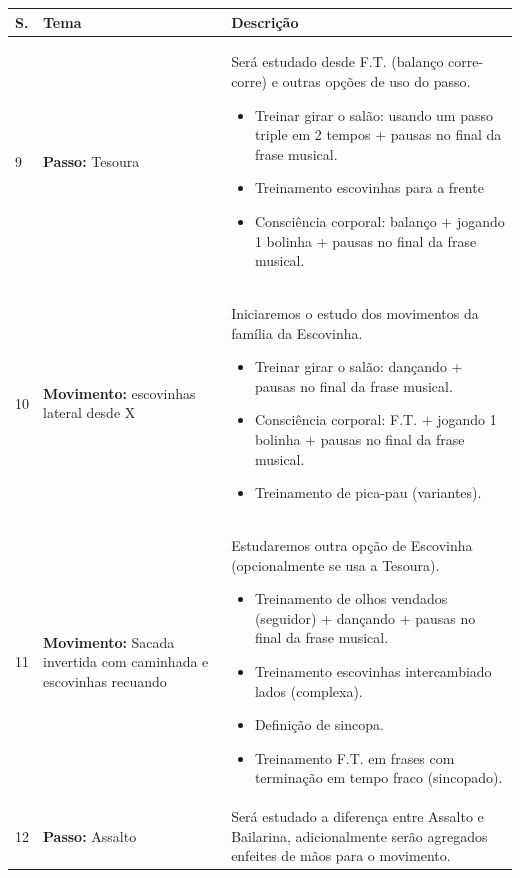 \documentclass[12pt, a4paper]{article}
\begin{document}
\begin{table}[h]
\centering
\begin{tabular}{|p{0.5cm}|p{3.0cm}|p{12.0cm}|}
\hline
S. & Tema & Descrição \\  \hline \hline
9 &  \textbf{Passo:} Tesoura & Será estudado desde F.T. (balanço corre-corre) e outras opções de uso do passo.
        \begin{itemize}
        \item Treinar girar o salão: usando um passo triple em 2 tempos + pausas no final da frase musical.
        \item Treinamento escovinhas para a frente
        \item Consciência corporal: balanço + jogando 1 bolinha + pausas no final da frase musical.
        \end{itemize}
        \\ \hline 
10&  \textbf{Movimento:} escovinhas lateral desde X & Iniciaremos o estudo dos movimentos da família da Escovinha.
        \begin{itemize}
        \item Treinar girar o salão: dançando + pausas no final da frase musical.
        \item Consciência corporal: F.T. + jogando 1 bolinha + pausas no final da frase musical.
        \item Treinamento de pica-pau (variantes).
        \end{itemize}
        \\ \hline 
11&  \textbf{Movimento:} Sacada invertida com caminhada e escovinhas recuando & Estudaremos outra opção de Escovinha (opcionalmente se usa a Tesoura). 
        \begin{itemize}
        \item Treinamento de olhos vendados (seguidor) + dançando + pausas no final da frase musical.
        \item Treinamento escovinhas intercambiado lados (complexa).
        \item Definição de sincopa.
        \item Treinamento F.T. em frases com terminação em tempo fraco (sincopado).
        \end{itemize}
        \\ \hline 
12&  \textbf{Passo:} Assalto & Será estudado a diferença entre Assalto e Bailarina, adicionalmente serão agregados enfeites de mãos para o movimento. 

\end{tabular}
\end{table}
\end{document}
